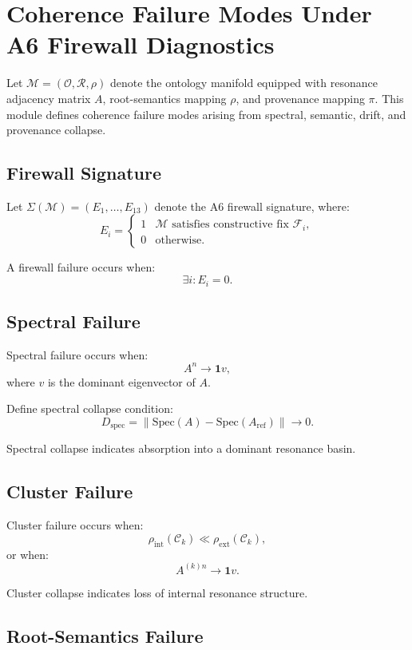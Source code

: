 \section{Coherence Failure Modes Under A6 Firewall Diagnostics}

Let $\mathcal{M} = (\mathcal{O}, \mathcal{R}, \rho)$ denote the ontology
manifold equipped with resonance adjacency matrix $A$, root-semantics
mapping $\rho$, and provenance mapping $\pi$. This module defines coherence
failure modes arising from spectral, semantic, drift, and provenance
collapse.

\subsection{Firewall Signature}

Let $\Sigma(\mathcal{M}) = (E_1, \ldots, E_{13})$ denote the A6 firewall
signature, where:
\[
E_i =
\begin{cases}
1 & \mathcal{M} \text{ satisfies constructive fix } \mathcal{F}_i, \\
0 & \text{otherwise}.
\end{cases}
\]

A firewall failure occurs when:
\[
\exists i : E_i = 0.
\]

\subsection{Spectral Failure}

Spectral failure occurs when:
\[
A^n \to \mathbf{1} v,
\]
where $v$ is the dominant eigenvector of $A$.

Define spectral collapse condition:
\[
D_{\mathrm{spec}} = \left\| \mathrm{Spec}(A) - \mathrm{Spec}(A_{\mathrm{ref}}) \right\| \to 0.
\]

Spectral collapse indicates absorption into a dominant resonance basin.

\subsection{Cluster Failure}

Cluster failure occurs when:
\[
\rho_{\mathrm{int}}(\mathcal{C}_k) \ll \rho_{\mathrm{ext}}(\mathcal{C}_k),
\]
or when:
\[
A^{(k)n} \to \mathbf{1} v.
\]

Cluster collapse indicates loss of internal resonance structure.

\subsection{Root-Semantics Failure}

